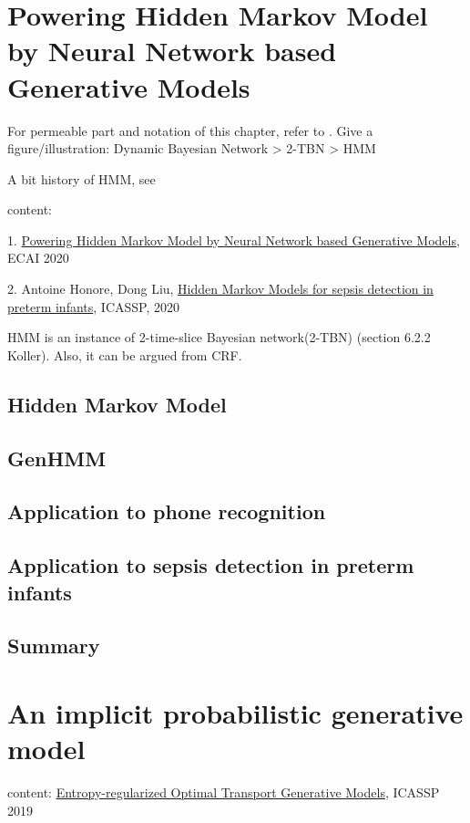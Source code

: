 \chapter{Powering Hidden Markov Model by Neural Network based Generative Models}

For permeable part and notation of this chapter, refer to \cite[Chapter~6.2]{koller2009pgm}.
Give a figure/illustration: Dynamic Bayesian Network > 2-TBN > HMM

A bit history of HMM, see \cite[Chapter~6.8]{koller2009pgm}

content:

1. \href{https://arxiv.org/abs/1910.05744}{Powering Hidden Markov Model by Neural Network based Generative Models}, ECAI 2020

2. Antoine Honore, Dong Liu, \href{https://arxiv.org/pdf/1910.13904.pdf}{Hidden Markov Models for sepsis detection in preterm infants}, ICASSP, 2020

HMM is an instance of 2-time-slice Bayesian network(2-TBN) (section 6.2.2 Koller). Also, it can be argued from CRF.
\section{Hidden Markov Model}

\section{GenHMM}

\section{Application to phone recognition}

\section{Application to sepsis detection in preterm infants}

\section{Summary}

\chapter{An implicit probabilistic generative model}
content: \href{https://ieeexplore.ieee.org/stamp/stamp.jsp?arnumber=8682721}{Entropy-regularized Optimal Transport Generative Models}, ICASSP 2019


